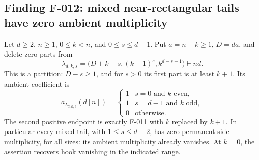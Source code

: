 \subsection*{Finding F-012: mixed near-rectangular tails have zero ambient multiplicity}
Let \(d\geq2\), \(n\geq1\), \(0\leq k<n\), and
\(0\leq s\leq d-1\). Put \(a=n-k\geq1\), \(D=da\), and
delete zero parts from
\[
 \lambda_{d,k,s}
  =\bigl(D+k-s,(k+1)^s,k^{d-s-1}\bigr)\vdash nd.
\]
This is a partition: \(D-s\geq1\), and for \(s>0\) its
first part is at least \(k+1\). Its ambient coefficient is
\begin{equation}\label{eq:F012}
 a_{\lambda_{d,k,s}}(d[n])=
 \begin{cases}
 1& s=0\text{ and }k\text{ even},\\
 1& s=d-1\text{ and }k\text{ odd},\\
 0&\text{otherwise}.
 \end{cases}
\end{equation}
The second positive endpoint is exactly F-011 with \(k\) replaced
by \(k+1\). In particular every mixed tail, with
\(1\leq s\leq d-2\), has zero permanent-side multiplicity,
for all sizes: its ambient multiplicity already vanishes.
At \(k=0\), the assertion recovers hook vanishing in the
indicated range.

